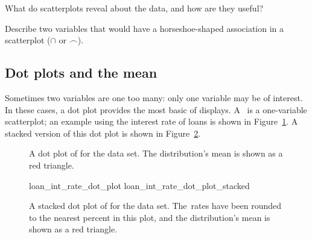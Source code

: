 \begin{exercisewrap}
\begin{nexercise}
What do scatterplots reveal about the data,
and how are they useful?\footnotemark{}
\end{nexercise}
\end{exercisewrap}

\begin{exercisewrap}
\begin{nexercise}
Describe two variables that would have a horseshoe-shaped
association in a scatterplot ($\cap$ or $\frown$).\footnotemark{}
\end{nexercise}
\end{exercisewrap}



\subsection{Dot plots and the mean}
\label{dotPlot}

Sometimes two variables are one too many:
only one variable may be of interest.
In these cases, a dot plot provides the most basic of displays.
A~ is a one-variable scatterplot;
an example using the interest rate of \loanN{} loans
is shown in Figure~\ref{loan_int_rate_dot_plot}.
A stacked version of this dot plot is shown in
Figure~\ref{loan_int_rate_dot_plot_stacked}.

\begin{figure}[h]
  \centering
  \caption{A dot plot of 
      for the  data set.
      The distribution's mean is shown as a red triangle.}
  \label{loan_int_rate_dot_plot}
\end{figure}

\begin{figure}[h]
  \centering
      {loan_int_rate_dot_plot}
      {loan_int_rate_dot_plot_stacked}
  \caption{A stacked dot plot of
      for the  data set.
      The~rates have been rounded to the nearest
      percent in this plot, and the
      distribution's mean is shown as a red triangle.}
  \label{loan_int_rate_dot_plot_stacked}
\end{figure}

